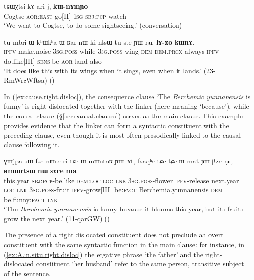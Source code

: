 \begin{exe}
\ex \label{ex:purposive.right.disloc}
\gll tɕɯχtsi kɤ-ari-j, \textbf{kɯ-nɤmɲo} \\
Cogtse \textsc{aor}:\textsc{east}-go[II]-\textsc{1sg} \textsc{sbj}:\textsc{pcp}-watch \\
\glt `We went to Cogtse, to do some sightseeing.' (conversation)
\end{exe}

\begin{exe}
\ex \label{ex:concessive.cond.right.disloc}
\gll tu-mbri ɯ-kʰɯkʰa ɯ-ʁar nɯ ki ntsɯ tu-ste ɲɯ-ŋu, \textbf{lɤ-zo} \textbf{kɯnɤ}. \\
\textsc{ipfv}-make.noise \textsc{3sg}.\textsc{poss}-while \textsc{3sg}.\textsc{poss}-wing \textsc{dem} \textsc{dem}.\textsc{prox} always \textsc{ipfv}-do.like[III] \textsc{sens}-be \textsc{aor}-land also \\
\glt `It does like this with its wings when it sings, even when it lands.' (23-RmWrcWftsa)
()
\end{exe}

In (\ref{ex:cause.right.disloc}), the consequence clause  `The \textit{Berchemia yunnanensis} is funny' is right-dislocated together with the linker  (here meaning `because'), while the causal clause (§\ref{sec:causal.clauses}) serves as the main clause. This example provides evidence that the linker  can form a syntactic constituent with the preceding clause, even though it is most often prosodically linked to the causal clause following it.

\begin{exe}
\ex \label{ex:cause.right.disloc}
\gll ɣɯjpa kɯ-fse nɯre ri tɕe ɯ-mɯntoʁ ɲɯ-lɤt, fsaqʰe tɕe tɕe ɯ-mat ɲɯ-βze ŋu, \textbf{ʁmɯrtsɯ} \textbf{nɯ} \textbf{sɤre} \textbf{ma}. \\
this.year \textsc{sbj}:\textsc{pcp}-be.like \textsc{dem}:\textsc{loc} \textsc{loc} \textsc{lnk} \textsc{3sg}.\textsc{poss}-flower \textsc{ipfv}-release next.year \textsc{loc} \textsc{lnk} \textsc{3sg}.\textsc{poss}-fruit \textsc{ipfv}-grow[III] be:\textsc{fact} Berchemia.yunnanensis \textsc{dem} be.funny:\textsc{fact} \textsc{lnk} \\
\glt `The \textit{Berchemia yunnanensis} is funny because it blooms this year, but its fruits grow the next year.' (11-qarGW)
()
\end{exe}

The presence of a right dislocated constituent does not preclude an overt constituent with the same syntactic function in the main clause: for instance, in (\ref{ex:A.in.situ.right.disloc}) the ergative phrase `the father' and the right-dislocated constituent  `her husband' refer to the same person, transitive subject of the sentence.

